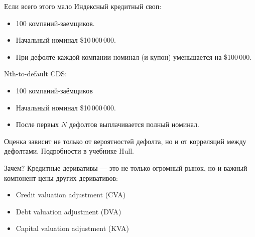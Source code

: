 \documentclass{beamer}
\begin{document}
\begin{frame}{Если всего этого мало}
\justify
Индексный кредитный своп:
\begin{itemize}
\item 100 компаний-заемщиков.
\item Начальный номинал \$10\,000\,000.
\item При дефолте каждой компании номинал (и купон) уменьшается на \$100\,000.
\end{itemize}

Nth-to-default CDS:
\begin{itemize}
\item 100 компаний-заёмщиков
\item Начальный номинал \$10\,000\,000.
\item После первых $N$ дефолтов выплачивается полный номинал.
\end{itemize}
Оценка зависит не только от вероятностей дефолта, но и от корреляций между дефолтами. Подробности в учебнике Hull.
\end{frame}



\begin{frame}{Зачем?}
\justify
Кредитные деривативы --- это не только огромный рынок, но и важный компонент цены других деривативов:
\begin{itemize}
\item Credit valuation adjustment (CVA)
\item Debt valuation adjustment (DVA)
\item Capital valuation adjustment (KVA)
\end{itemize}
\end{frame}
\end{document}
